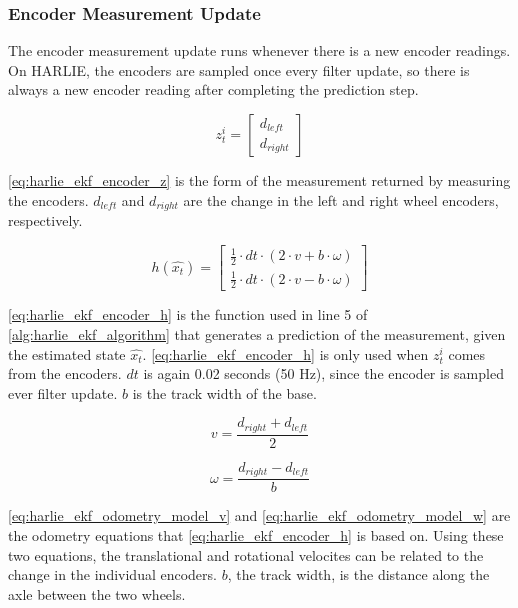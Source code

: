 \subsubsection{Encoder Measurement Update}\label{subsubsec:harlie_ekf_encoder_measurement}

The encoder measurement update runs whenever there is a new encoder readings. On HARLIE, the encoders are sampled once every filter update, so there is always a new encoder reading after completing the prediction step.

\begin{equation}
	z_t^i = 
	\begin{bmatrix}
		d_{left} \\
		d_{right}
	\end{bmatrix}
	\label{eq:harlie_ekf_encoder_z}
\end{equation}

\eqref{eq:harlie_ekf_encoder_z} is the form of the measurement returned by measuring the encoders. $d_{left}$ and $d_{right}$ are the change in the left and right wheel encoders, respectively.

\begin{equation}
	h\left(\hat{x_t}\right) =
	\begin{bmatrix}
		\frac{1}{2} \cdot dt \cdot \left( 2 \cdot v + b \cdot \omega \right) \\
		\frac{1}{2} \cdot dt \cdot \left( 2 \cdot v - b \cdot \omega \right) 
	\end{bmatrix}
	\label{eq:harlie_ekf_encoder_h}
\end{equation}

\eqref{eq:harlie_ekf_encoder_h} is the function used in line 5 of \autoref{alg:harlie_ekf_algorithm} that generates a prediction of the measurement, given the estimated state $\hat{x_t}$. \eqref{eq:harlie_ekf_encoder_h} is only used when $z_t^i$ comes from the encoders. $dt$ is again 0.02 seconds (50 Hz), since the encoder is sampled ever filter update. $b$ is the track width of the base. 

\begin{equation}
	v = \frac{d_{right}+d_{left}}{2}
	\label{eq:harlie_ekf_odometry_model_v}
\end{equation}

\begin{equation}
	\omega = \frac{d_{right} - d_{left}}{b}
	\label{eq:harlie_ekf_odometry_model_w}
\end{equation}

\eqref{eq:harlie_ekf_odometry_model_v} and \eqref{eq:harlie_ekf_odometry_model_w} are the odometry equations that \eqref{eq:harlie_ekf_encoder_h} is based on. Using these two equations, the translational and rotational velocites can be related to the change in the individual encoders. $b$, the track width, is the distance along the axle between the two wheels.

